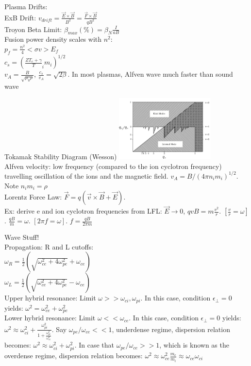 \documentclass[10pt]{extarticle}
\begin{document}
\begin{multicols}{3}
Plasma Drifts:\\
ExB Drift: $v_{drift} = \frac{\vec{E}\times\vec{B}}{B^{2}} = \frac{\vec{F}\times\vec{B}}{qB^{2}}$\\
Troyon Beta Limit: $\beta_{max}(\%) = \beta_{N}\frac{I}{aB}$\\
Fusion power density scales with $n^{2}$:\\
$p_{f} = \frac{n^{2}}{4}<\sigma v> E_{f}$\\
$c_{s} = (\frac{ZT_{e} + \gamma}T_{i}{m_{i}})^{1/2}$\\
$v_{A} = \frac{B}{\sqrt{\mu_{0}\rho}}$, $\frac{c_{s}}{v_{A}} = \sqrt{2\beta}$.  In most plasmas, Alfven wave much faster than sound wave

Tokamak Stability Diagram (Wesson)
\includegraphics[width=5cm]{images/Tokamak_Stability_Diagram.png}\\



Alfven velocity: low frequency (compared to the ion cyclotron frequency) travelling oscillation of the ions and the magnetic field.  $v_{A} = B / (4 \pi n_{i} m_{i} ) ^{1/2}$.  Note $n_{i}m_{i} = \rho$\\

Lorentz Force Law: $\vec{F} = q(\vec{v}\times\vec{B} + \vec{E})$.\\  Ex: derive e and ion cyclotron frequencies from LFL: $\vec{E} \rightarrow 0$, $qvB = m\frac{v^{2}}{r}$.  $[\frac{v}{r} = \omega]$. $\frac{qB}{m} = \omega$. $[2\pi f = \omega]$. $f = \frac{qB}{2\pi m}$

Wave Stuff!\\
Propagation: R and L cutoffs:\\
$\omega_{R} = \frac{1}{2} (\sqrt{\omega_{ce}^{2} + 4 \omega_{pe}^{2}} + \omega_{ce})$\\
$\omega_{L} = \frac{1}{2} (\sqrt{\omega_{ce}^{2} + 4 \omega_{pe}^{2}} - \omega_{ce})$\\
 Upper hybrid resonance: Limit $\omega >> \omega_{ci}, \omega_{pi}$.  In this case, condition $\epsilon_{\perp} = 0$ yields:
 $\omega^{2} = \omega_{ce}^{2} + \omega_{pe}^{2}$\\
 Lower hybrid resonance: Limit $\omega << \omega_{ce}$.  In this case, condition $\epsilon_{\perp} = 0$ yields:
$\omega^{2} \approx \omega_{ci}^{2} + \frac{\omega_{pi}^{2}}{1 + \frac{\omega_{pe}^{2}}{\omega_{ce}^{2}}}$.  Say $\omega_{pe} / \omega_{ce} << 1$, underdense regime, dispersion relation becomes: $\omega^{2} \approx \omega_{ci}^{2} + \omega_{pi}^{2}$.  In case that $\omega_{pe} / \omega_{ce} >> 1$, which is known as the overdense regime, dispersion relation becomes: $\omega^{2} \approx \omega_{ce}^{2} \frac{m_{e}}{m_{i}} \approx \omega_{ce} \omega_{ci}$ 
 

\end{multicols}
\end{document}
